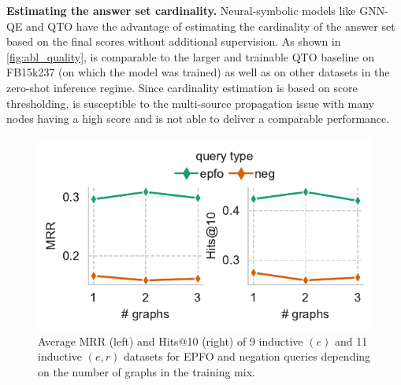 \textbf{Estimating the answer set cardinality.}
Neural-symbolic models like GNN-QE and QTO have the advantage of estimating the cardinality of the answer set based on the final scores without additional supervision. 
As shown in \autoref{fig:abl_quality}, \method is comparable to the larger and trainable QTO baseline on FB15k237 (on which the model was trained) as well as on other datasets in the zero-shot inference regime. 
Since cardinality estimation is based on score thresholding, \methodlp is susceptible to the multi-source propagation issue with many nodes having a high score and is not able to deliver a comparable performance.


\begin{figure}
\begin{minipage}{0.5\textwidth}
\vspace{-3em}
    \centering
    \includegraphics[width=1.0\linewidth]{figs/ultraquery_num_graphs.pdf}
    \caption{Average MRR (left) and Hits@10 (right) of 9 inductive $(e)$ and 11 inductive $(e,r)$ \clqa datasets for EPFO and negation queries depending on the number of graphs in the training mix.}
    \label{fig:num_graphs1}
    \vspace{-1em}
\end{minipage}
\end{figure}


